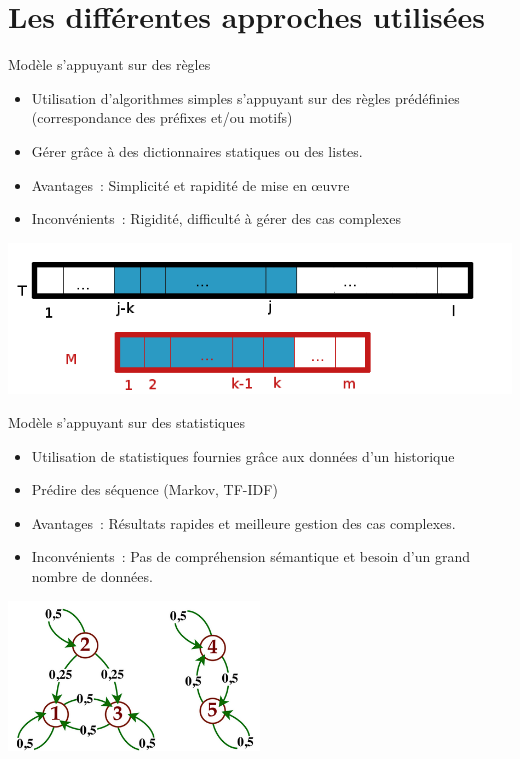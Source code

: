\section{Les différentes approches utilisées}
\begin{frame}{Modèle s'appuyant sur des règles}
	\begin{itemize}
		\item Utilisation d'algorithmes simples s'appuyant sur des règles prédéfinies (correspondance des préfixes et/ou motifs)
		\item Gérer grâce à des dictionnaires statiques ou des listes.
		\item Avantages~: Simplicité et rapidité de mise en œuvre
		\item Inconvénients~: Rigidité, difficulté à gérer des cas complexes
	\end{itemize}
	\begin{center}
		\includegraphics[width=\textwidth]{images/regles.png}
	\end{center}
\end{frame}

\begin{frame}{Modèle s'appuyant sur des statistiques}
	\begin{itemize}
		\item Utilisation de statistiques fournies grâce aux données d'un historique
		\item Prédire des séquence (Markov, TF-IDF)
		\item Avantages~: Résultats rapides et meilleure gestion des cas complexes.
		\item Inconvénients~: Pas de compréhension sémantique et besoin d'un grand nombre de données.
	\end{itemize}
	\begin{center}
		\includegraphics[width=0.5\textwidth]{images/statistiques.png}
	\end{center}
\end{frame}



